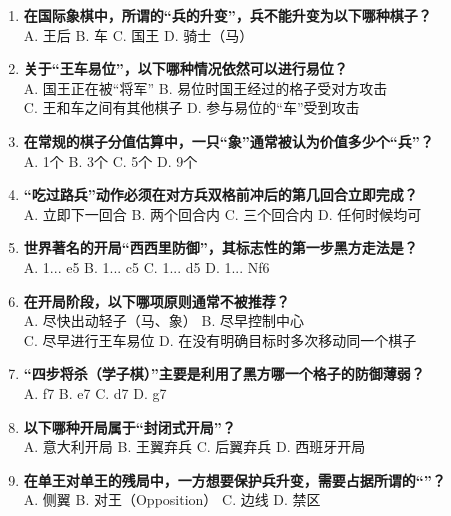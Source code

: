 \documentclass[a4paper, 11pt]{ctexart}
\begin{document}
\begin{enumerate}[label=\arabic*., itemsep=1.5em]
    \item \textbf{在国际象棋中，所谓的“兵的升变”，兵不能升变为以下哪种棋子？} \\
    A. 王后 \qquad B. 车 \qquad C. 国王 \qquad D. 骑士（马）

    \item \textbf{关于“王车易位”，以下哪种情况依然可以进行易位？} \\
    A. 国王正在被“将军” \qquad B. 易位时国王经过的格子受对方攻击 \\
    C. 王和车之间有其他棋子 \qquad D. 参与易位的“车”受到攻击

    \item \textbf{在常规的棋子分值估算中，一只“象”通常被认为价值多少个“兵”？} \\
    A. 1个 \qquad B. 3个 \qquad C. 5个 \qquad D. 9个

    \item \textbf{“吃过路兵”动作必须在对方兵双格前冲后的第几回合立即完成？} \\
    A. 立即下一回合 \qquad B. 两个回合内 \qquad C. 三个回合内 \qquad D. 任何时候均可

    \item \textbf{世界著名的开局“西西里防御”，其标志性的第一步黑方走法是？} \\
    A. 1... e5 \qquad B. 1... c5 \qquad C. 1... d5 \qquad D. 1... Nf6

    \item \textbf{在开局阶段，以下哪项原则通常不被推荐？} \\
    A. 尽快出动轻子（马、象） \qquad B. 尽早控制中心 \\
    C. 尽早进行王车易位 \qquad D. 在没有明确目标时多次移动同一个棋子

    \item \textbf{“四步将杀（学子棋）”主要是利用了黑方哪一个格子的防御薄弱？} \\
    A. f7 \qquad B. e7 \qquad C. d7 \qquad D. g7

    \item \textbf{以下哪种开局属于“封闭式开局”？} \\
    A. 意大利开局 \qquad B. 王翼弃兵 \qquad C. 后翼弃兵 \qquad D. 西班牙开局

    \item \textbf{在单王对单王的残局中，一方想要保护兵升变，需要占据所谓的“\uline{\hspace{2em}}”？} \\
    A. 侧翼 \qquad B. 对王（Opposition） \qquad C. 边线 \qquad D. 禁区


\end{enumerate}
\end{document}
